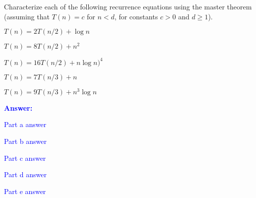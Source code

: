\item{}
Characterize each of the following recurrence equations using the master theorem
(assuming that $T(n)=c$ for $n<d$, for constants $c>0$ and $d\ge1$).
\begin{list}{\textbf{}}{}
\item $T(n)=2T(n/2)+\log n$
\item $T(n)=8T(n/2)+n^2$
\item $T(n)=16T(n/2)+n\log n)^4$
\item $T(n)=7T(n/3)+n$
\item $T(n)=9T(n/3)+n^3\log n$
\end{list}
\vskip12pt
\ifanswers
\textcolor{blue}{
\textbf{Answer:}\\
\begin{list}{\textbf{}}{}
\item Part a answer
\item Part b answer
\item Part c answer
\item Part d answer
\item Part e answer
\end{list}
}
\newpage
\fi
